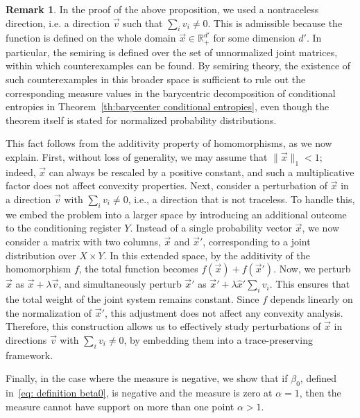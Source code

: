 \documentclass[aps,pra,11pt,onecolumn,nofootinbib,tightenlines]{revtex4-2}
\theoremstyle{definition}
\newtheorem{remark}[theorem]{Remark}
\begin{document}
\begin{remark}
In the proof of the above proposition, we used a nontraceless direction, i.e. a direction $\vec{v}$ such that $\sum_i v_i \neq 0$.
 This is admissible because the function is defined on the whole domain $\vec{x} \in \mathbb{R}_+^{d'}$ for some dimension $d'$.  In particular, the semiring is defined over the set of unnormalized joint matrices, within which counterexamples can be found. By semiring theory, the existence of such counterexamples in this broader space is sufficient to rule out the corresponding measure values in the barycentric decomposition of conditional entropies in Theorem~\ref{th:barycenter conditional entropies}, even though the theorem itself is stated for normalized probability distributions.

This fact follows from the additivity property of homomorphisms, as we now explain. First, without loss of generality, we may assume that $\|\vec{x}\|_1 < 1$; indeed, $\vec{x}$ can always be rescaled by a positive constant, and such a multiplicative factor does not affect convexity properties.
Next, consider a perturbation of $\vec{x}$ in a direction $\vec{v}$ with $\sum_i v_i \neq 0$, i.e., a direction that is not traceless. To handle this, we embed the problem into a larger space by introducing an additional outcome to the conditioning register $Y$. Instead of a single probability vector $\vec{x}$, we now consider a matrix with two columns, $\vec{x}$ and $\vec{x}'$, corresponding to a joint distribution over $X \times Y$.
In this extended space, by the additivity of the homomorphism $f$, the total function becomes $f(\vec{x}) + f(\vec{x}')$. Now, we perturb $\vec{x}$ as $\vec{x} + \lambda \vec{v}$, and simultaneously perturb $\vec{x}'$ as $\vec{x}' + \lambda \hat{x}' \sum_i v_i$. This ensures that the total weight of the joint system remains constant. Since $f$ depends linearly on the normalization of $\vec{x}'$, this adjustment does not affect any convexity analysis. Therefore, this construction allows us to effectively study perturbations of $\vec{x}$ in directions $\vec{v}$ with $\sum_i v_i \neq 0$, by embedding them into a trace-preserving framework.

\end{remark}
Finally, in the case where the measure is negative, we show that if $\beta_0$, defined in~\eqref{eq: definition beta0},
is negative and the measure is zero at $\alpha=1$, then the measure cannot have support on more than one point $\alpha > 1$.
\end{document}
